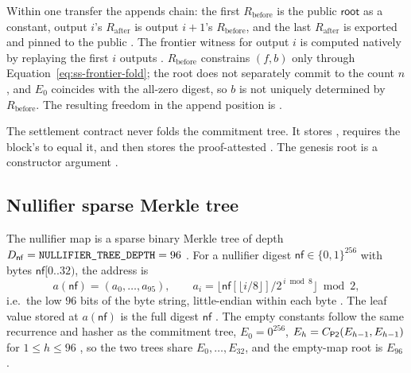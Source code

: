 Within one transfer the appends chain: the first $R_{\mathrm{before}}$ is the
public $\mathsf{root}$ as a constant, output $i$'s $R_{\mathrm{after}}$ is output
$i{+}1$'s $R_{\mathrm{before}}$, and the last $R_{\mathrm{after}}$ is exported
and pinned to the public 
. The frontier witness for
output $i$ is computed natively by replaying the first $i$ outputs
. $R_{\mathrm{before}}$ constrains
$(f,b)$ only through Equation~\eqref{eq:ss-frontier-fold}; the root does not
separately commit to the count $n$, and $E_0$ coincides with the all-zero
digest, so $b$ is not uniquely determined by $R_{\mathrm{before}}$. The
resulting freedom in the append position is .

\begin{property}
The settlement contract never folds the commitment tree. It stores
, requires the block's  to equal it, and then
stores the proof-attested 
. The genesis root is
a constructor argument .
\end{property}

\subsection{Nullifier sparse Merkle tree}
\label{subsec:ss-smt}

\begin{definition}
\label{def:ss-smt}
The nullifier map is a sparse binary Merkle tree of depth
$D_{\mathsf{nf}} = \texttt{NULLIFIER\_TREE\_DEPTH} = 96$
. For a nullifier digest
$\mathsf{nf} \in \{0,1\}^{256}$ with bytes $\mathsf{nf}[0..32)$, the address is
\begin{equation}
  a(\mathsf{nf}) = (a_0,\dots,a_{95}), \qquad
  a_i = \big\lfloor \mathsf{nf}[\lfloor i/8 \rfloor] / 2^{\,i \bmod 8} \big\rfloor \bmod 2 ,
\end{equation}
i.e.\ the low $96$ bits of the byte string, little-endian within each byte
. The leaf value stored at
$a(\mathsf{nf})$ is the full digest $\mathsf{nf}$
. The empty
constants follow the same recurrence and hasher as the commitment tree,
$E_0 = 0^{256}$, $E_h = C_{\mathsf{P2}}(E_{h-1},E_{h-1})$ for $1 \le h \le 96$
, so the two trees share
$E_0,\dots,E_{32}$, and the empty-map root is $E_{96}$
.
\end{definition}

